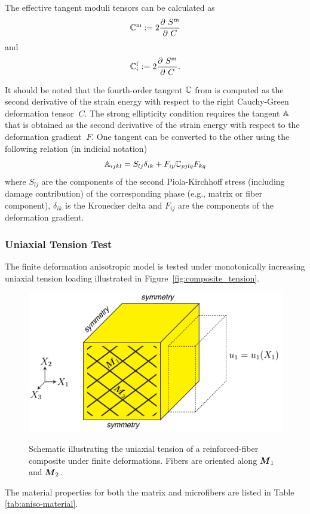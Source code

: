 \documentclass[12pt]{article}
\newcommand{\mtrx}{{\text{m}}}
\newcommand{\fiber}{{\text{f}}}
\numberwithin{equation}{section}
\begin{document}
The effective tangent moduli tensors can be calculated as
\begin{equation}\label{eq:aniso-tangent1}
  \bbC^\mtrx
  :=
  2 \frac{\partial ~S^\mtrx}{\partial~C}
\end{equation}
and
\begin{equation}\label{eq:aniso-tangent2}
  \bbC^\fiber_i
  :=
  2 \frac{\partial ~S^\mtrx}{\partial~C}.
\end{equation}

It should be noted that the fourth-order tangent $\mathbb{C}$ from
 is computed as the second derivative of the
strain energy with respect to the right Cauchy-Green deformation
tensor $~C$. The strong ellipticity condition
 requires the tangent $\mathbb{A}$ that is
obtained as the second derivative of the strain energy with respect to
the deformation gradient $~F$. One tangent can be converted to the
other using the following relation (in indicial notation)
\begin{equation}\label{eq:aniso-tangent3}
  \mathbb{A}_{ijkl} = S_{lj} \delta_{ik}
    + F_{ip} \mathbb{C}_{pjlq} F_{kq}
\end{equation}
where $S_{lj}$ are the components of the second Piola-Kirchhoff stress
(including damage contribution) of the corresponding phase (e.g.,
matrix or fiber component), $\delta_{ik}$ is the Kronecker delta and
$F_{ij}$ are the components of the deformation gradient.

\subsubsection{Uniaxial Tension Test}

The finite deformation anisotropic model is tested under monotonically
increasing uniaxial tension loading illustrated in Figure~\ref{fig:composite_tension}.
\begin{figure}[!htbp]
  \begin{center}
      \includegraphics[width=120mm]{figs/composite_tension_schematic.pdf}
      \label{fig:composite_tension}
     \caption{Schematic illustrating the uniaxial tension of a reinforced-fiber composite under finite deformations. Fibers are oriented along ${\boldsymbol{M}}_{1}$ and ${\boldsymbol{M}}_{2}$.}
    \label{fig:parametrizations}
  \end{center}
\end{figure}
The material properties for both
the matrix and microfibers are listed in Table~
\ref{tab:aniso-material}.
\end{document}

